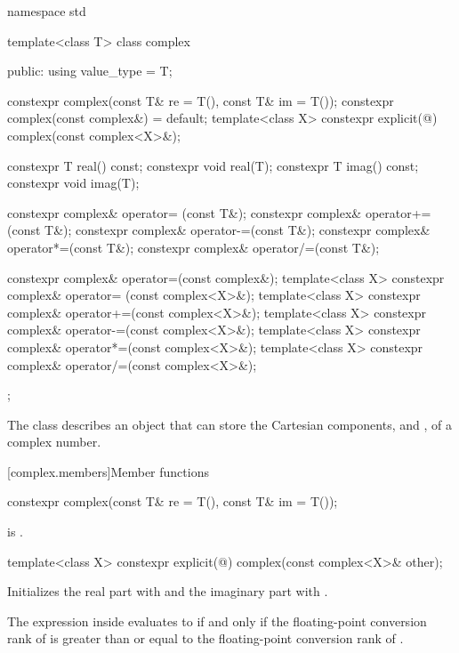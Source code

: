 %
%
\begin{codeblock}
namespace std {
  template<class T> class complex {
  public:
    using value_type = T;

    constexpr complex(const T& re = T(), const T& im = T());
    constexpr complex(const complex&) = default;
    template<class X> constexpr explicit(@\seebelow@) complex(const complex<X>&);

    constexpr T real() const;
    constexpr void real(T);
    constexpr T imag() const;
    constexpr void imag(T);

    constexpr complex& operator= (const T&);
    constexpr complex& operator+=(const T&);
    constexpr complex& operator-=(const T&);
    constexpr complex& operator*=(const T&);
    constexpr complex& operator/=(const T&);

    constexpr complex& operator=(const complex&);
    template<class X> constexpr complex& operator= (const complex<X>&);
    template<class X> constexpr complex& operator+=(const complex<X>&);
    template<class X> constexpr complex& operator-=(const complex<X>&);
    template<class X> constexpr complex& operator*=(const complex<X>&);
    template<class X> constexpr complex& operator/=(const complex<X>&);
  };
}
\end{codeblock}

\pnum
The class
describes an object that can
store the Cartesian components,
and
,
of a complex
number.

[complex.members]{Member functions}

%
\begin{itemdecl}
constexpr complex(const T& re = T(), const T& im = T());
\end{itemdecl}

\begin{itemdescr}
\pnum
\ensures
{} is .
\end{itemdescr}

%
\begin{itemdecl}
template<class X> constexpr explicit(@\seebelow@) complex(const complex<X>& other);
\end{itemdecl}

\begin{itemdescr}
\pnum
\effects
Initializes the real part with  and
the imaginary part with .

\pnum
\remarks
The expression inside  evaluates to 
if and only if the floating-point conversion rank of 
is greater than or equal to the floating-point conversion rank of .
\end{itemdescr}

